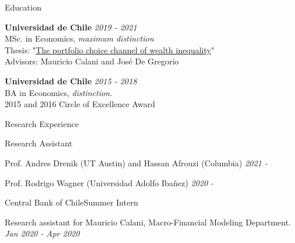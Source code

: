 \documentclass{resume_style} %
\begin{document}

\begin{rSection}{Education}

{\bf Universidad de Chile} \hfill { \it 2019 - 2021} 
\\ MSc. in Economics, \textit{maximum distinction}
\\ Thesis: "\href{https://lucas-rosso.github.io/files/LucasRosso_Tesis.pdf}{The portfolio choice channel of wealth inequality}"
\\ Advisors: Mauricio Calani and Jos\'e De Gregorio

{\bf Universidad de Chile} \hfill {\it 2015 - 2018} 
\\ BA in Economics, \textit{distinction}.\hfill %
\\ 2015 and 2016 Circle of Excellence Award 
\end{rSection}


\begin{rSection}{Research Experience}

\begin{rSubsection}{Research Assistant}{}{}{}
\item Prof. Andres Drenik (UT Austin) and Hassan Afrouzi (Columbia) \hfill {\it 2021 - }
\item Prof. Rodrigo Wagner (Universidad Adolfo Iba\~nez) \hfill {\it 2020 - }
\end{rSubsection}

\begin{rSubsection}{Central Bank of Chile}{}{Summer Intern}{}
\item Research assistant for Mauricio Calani, Macro-Financial Modeling Department. \hfill {\it Jan 2020 - Apr 2020}
 \end{rSubsection}
\end{rSection}
\end{document}
